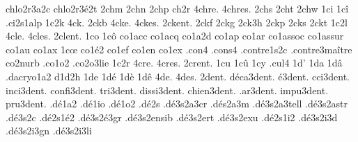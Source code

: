 {                    chlo2r3a2c
                    chlo2r3é2t
2chm
2chn
2chp
ch2r
4chre.
4chres.
2chs
2cht
2chw
1ci
1cî
                    .ci2s1alp
1c2k
4ck.
2ckb
4cke.
4ckes.
2ckent. %
2ckf
2ckg
2ck3h
2ckp
2cks
2ckt
1c2l
4cle.
4cles.
2clent. %
1co
1cô
                    co1acc
                    co1acq
                    co1a2d
                    co1ap
                    co1ar
                    co1assoc
                    co1assur
                    co1au
                    co1ax
1cœ
                    co1é2
                    co1ef
                    co1en
                    co1ex
                    .con4  %
                    .cons4 %
                    .contre1s2c
                    .contre3maître %
                    co2nurb
                    .co1o2
                    .co2o3lie
1c2r
4cre.
4cres.
2crent. %
1cu
1cû
1cy
.cul4 %
1d'
1da
1dâ
                    .dacryo1a2
d1d2h
1de
1dé
1dè
1dê
4de.
4des.
     2dent.
 déca3dent.
    é3dent.
  cci3dent.
 inci3dent.
confi3dent.
  tri3dent.
dissi3dent.
chien3dent.
  .ar3dent.
 impu3dent.
  pru3dent.
%
                    .dé1a2
                    .dé1io
                    .dé1o2
                    .dé2s %
                    .dé3s2a3cr
                    .dés2a3m %
                    .dé3s2a3tell
                    .dé3s2astr
                    .dé3s2c %
                    .dé2s1é2
                    .dé3s2é3gr
                    .dé3s2ensib
                    .dé3s2ert
                    .dé3s2exu
                    .dé2s1i2
                    .dé3s2i3d
                    .dé3s2i3gn
                    .dé3s2i3li
}
